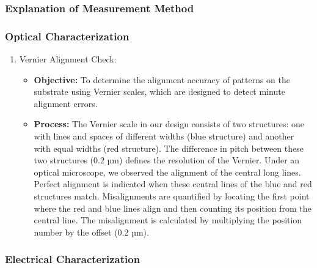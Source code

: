 \documentclass[a4paper, table]{article}
\begin{document}
\pagebreak

\subsubsection{Explanation of Measurement Method}
\subsubsection*{Optical Characterization}

\begin{enumerate}
    \item Vernier Alignment Check:
    \begin{itemize}
        \item \textbf{Objective:} To determine the alignment accuracy of patterns on the substrate using Vernier scales, which are designed to detect minute alignment errors.
        \item \textbf{Process:} The Vernier scale in our design consists of two structures: one with lines and spaces of different widths (blue structure) and another with equal widths (red structure). The difference in pitch between these two structures (0.2 µm) defines the resolution of the Vernier. Under an optical microscope, we observed the alignment of the central long lines. Perfect alignment is indicated when these central lines of the blue and red structures match. Misalignments are quantified by locating the first point where the red and blue lines align and then counting its position from the central line. The misalignment is calculated by multiplying the position number by the offset (0.2 µm).
    \end{itemize}
\end{enumerate}

\subsubsection*{Electrical Characterization}
\end{document}

